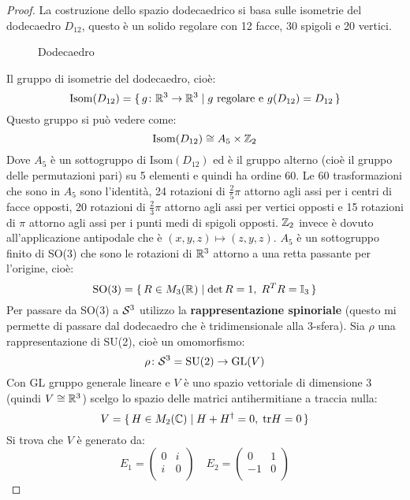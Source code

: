\begin{proof}
  La costruzione dello spazio dodecaedrico si basa sulle isometrie del dodecaedro $ D_{12} $,
  questo è un solido regolare con 12 facce, 30 spigoli e 20 vertici.
  \begin{figure*}[htbp]
    \centering
    \def\svgwidth{0.26\textwidth}
    
    \caption{Dodecaedro}
  \end{figure*}

  \noindent
  Il gruppo di isometrie del dodecaedro, cioè:
  \[
    \mathrm{Isom}(D_{12}) = \set{ g \colon \mathbb{R}^{3} \to \mathbb{R}^{3} | g \text{ regolare e } g(D_{12}) = D_{12}}
  \]
  Questo gruppo si può vedere come:
  \[
    \mathrm{Isom}(D_{12}) \cong A_5 \times \mathbb{Z}_2
  \]
  Dove $ A_5 $ è un sottogruppo di $ \mathrm{Isom}(D_{12}) $ ed è il gruppo
  alterno (cioè il gruppo delle permutazioni pari) su 5 elementi e quindi ha ordine 60.
  Le 60 trasformazioni che sono in $ A_5 $ sono l'identità, 24 rotazioni di $ \frac{2}{5} \pi $ attorno
  agli assi per i centri di facce opposti, 20 rotazioni di $ \frac{2}{3} \pi $ attorno
  agli assi per vertici opposti e 15 rotazioni di $ \pi $ attorno agli assi per
  i punti medi di spigoli opposti.
  $ \mathbb{Z}_2 $ invece è dovuto all'applicazione antipodale che è $ (x,y,z) \mapsto (z,y,z) $.
  $ A_5 $ è un sottogruppo finito di SO(3) che sono le rotazioni di $ \mathbb{R}^{3} $ attorno
  a una retta passante per l'origine, cioè:
  \[
    \mathrm{SO(3)} = \set{ R \in M_3(\mathbb{R}^{}) | \det{R} = 1, \;R^T R = \mathbb{I}_{3}}
  \]
  Per passare da SO(3) a $ \mathcal{S}^{3} $ utilizzo la \textbf{rappresentazione spinoriale}
  (questo mi permette di passare dal dodecaedro che è tridimensionale alla $ 3 $-sfera).
  Sia $ \rho $ una rappresentazione di SU(2), cioè un omomorfismo:
  \[
    \rho \colon \mathcal{S}^{3} = \mathrm{SU(2)} \to \mathrm{GL}(V)
  \]
  Con GL gruppo generale lineare e $ V $ è uno spazio vettoriale di dimensione
  3 (quindi $ V \cong \mathbb{R}^{3} $) scelgo lo spazio delle matrici antihermitiane a
  traccia nulla:
  \[
    V = \set{H \in M_2(\mathbb{C}) | H + H^\dagger = 0, \; \mathrm{tr}H  = 0}
  \]
  Si trova che $ V $ è generato da:
  \[
    E_1 =
    \begin{pmatrix}
      0 & i \\
      i & 0 \\
    \end{pmatrix}
    \quad
    E_2 =
    \begin{pmatrix}
      0 & 1 \\
      -1 & 0 \\
    \end{pmatrix}
\]
\end{proof}
